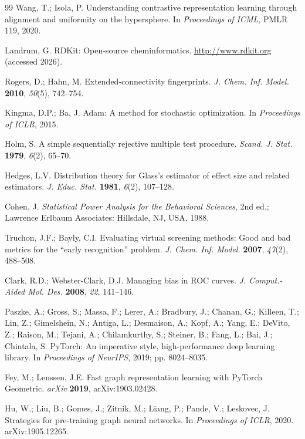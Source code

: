 \documentclass[10pt,a4paper,twocolumn]{article}
\begin{document}
\begin{thebibliography}{99}
Wang, T.; Isola, P. Understanding contrastive representation learning through alignment and uniformity on the hypersphere. In \textit{Proceedings of ICML}, PMLR 119, 2020.


Landrum, G. RDKit: Open-source cheminformatics. \url{http://www.rdkit.org} (accessed 2026).


Rogers, D.; Hahn, M. Extended-connectivity fingerprints. \textit{J. Chem. Inf. Model.} \textbf{2010}, \textit{50}(5), 742--754.


Kingma, D.P.; Ba, J. Adam: A method for stochastic optimization. In \textit{Proceedings of ICLR}, 2015.


Holm, S. A simple sequentially rejective multiple test procedure. \textit{Scand. J. Stat.} \textbf{1979}, \textit{6}(2), 65--70.


Hedges, L.V. Distribution theory for Glass's estimator of effect size and related estimators. \textit{J. Educ. Stat.} \textbf{1981}, \textit{6}(2), 107--128.


Cohen, J. \textit{Statistical Power Analysis for the Behavioral Sciences}, 2nd ed.; Lawrence Erlbaum Associates: Hillsdale, NJ, USA, 1988.


Truchon, J.F.; Bayly, C.I. Evaluating virtual screening methods: Good and bad metrics for the ``early recognition'' problem. \textit{J. Chem. Inf. Model.} \textbf{2007}, \textit{47}(2), 488--508.


Clark, R.D.; Webster-Clark, D.J. Managing bias in ROC curves. \textit{J. Comput.-Aided Mol. Des.} \textbf{2008}, \textit{22}, 141--146.


Paszke, A.; Gross, S.; Massa, F.; Lerer, A.; Bradbury, J.; Chanan, G.; Killeen, T.; Lin, Z.; Gimelshein, N.; Antiga, L.; Desmaison, A.; Kopf, A.; Yang, E.; DeVito, Z.; Raison, M.; Tejani, A.; Chilamkurthy, S.; Steiner, B.; Fang, L.; Bai, J.; Chintala, S. PyTorch: An imperative style, high-performance deep learning library. In \textit{Proceedings of NeurIPS}, 2019; pp. 8024--8035.


Fey, M.; Lenssen, J.E. Fast graph representation learning with PyTorch Geometric. \textit{arXiv} \textbf{2019}, arXiv:1903.02428.


Hu, W.; Liu, B.; Gomes, J.; Zitnik, M.; Liang, P.; Pande, V.; Leskovec, J. Strategies for pre-training graph neural networks. In \textit{Proceedings of ICLR}, 2020. arXiv:1905.12265.



\end{thebibliography}
\end{document}
